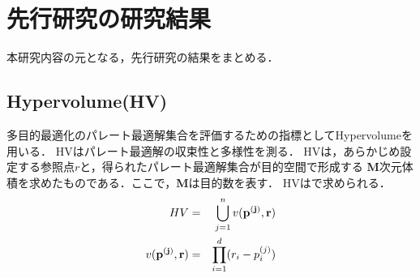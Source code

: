 \documentclass[main]{subfiles}
\begin{document}
    \chapter{先行研究の研究結果}
    本研究内容の元となる，先行研究の結果をまとめる\cite{senkoukenkyu}．

    \section{Hypervolume(HV)}
    多目的最適化のパレート最適解集合を評価するための指標としてHypervolumeを用いる\cite{hv}．
    HVはパレート最適解の収束性と多様性を測る．
    HVは，あらかじめ設定する参照点\boldmath$r$と，得られたパレート最適解集合が目的空間で形成する
    \textbf{M}次元体積を求めたものである．ここで，\textbf{M}は目的数を表す．
    HVは\label{hv_siki}で求められる．
    \begin{align}
        HV &=& \bigcup_{j=1}^n v(\bf{p}^{(j)}, \bf r) \\ 
        v(\bf{p}^{(j)}, \bf r) &=& \prod_{i=1}^d (r_i - p_i^{(j)})
        \label{hv_siki}
    \end{align}
\end{document}
